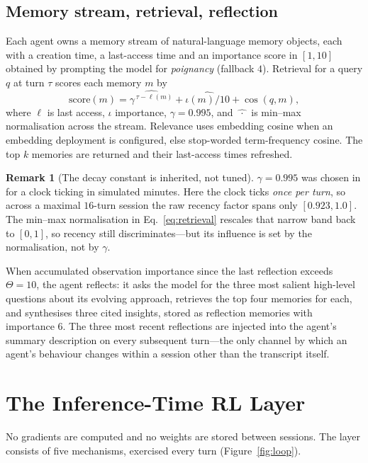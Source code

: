 \documentclass[11pt]{article}
\theoremstyle{plain}
\theoremstyle{definition}
\newtheorem{remark}{Remark}
\begin{document}
\subsection{Memory stream, retrieval, reflection}
Each agent owns a memory stream of natural-language memory objects, each with a
creation time, a last-access time and an importance score in $[1,10]$ obtained
by prompting the model for \emph{poignancy} (fallback $4$). Retrieval for a
query $q$ at turn $\tau$ scores each memory $m$ by
\begin{equation}
\mathrm{score}(m) = \widehat{\gamma^{\,\tau - \ell(m)}}
 + \widehat{\iota(m)/10}
 + \widehat{\cos(q,m)},
\label{eq:retrieval}
\end{equation}
where $\ell$ is last access, $\iota$ importance, $\gamma = 0.995$, and
$\widehat{\;\cdot\;}$ is min--max normalisation across the stream. Relevance
uses embedding cosine when an embedding deployment is configured, else
stop-worded term-frequency cosine. The top $k$ memories are returned and their
last-access times refreshed.

\begin{remark}[The decay constant is inherited, not tuned]
$\gamma = 0.995$ was chosen in \citet{park2023generative} for a clock ticking in
simulated minutes. Here the clock ticks \emph{once per turn}, so across a
maximal $16$-turn session the raw recency factor spans only $[0.923, 1.0]$. The
min--max normalisation in Eq.~\ref{eq:retrieval} rescales that narrow band back
to $[0,1]$, so recency still discriminates---but its influence is set by the
normalisation, not by $\gamma$.
\end{remark}

When accumulated observation importance since the last reflection exceeds
$\Theta = 10$, the agent reflects: it asks the model for the three most salient
high-level questions about its evolving approach, retrieves the top four
memories for each, and synthesises three cited insights, stored as reflection
memories with importance $6$. The three most recent reflections are injected
into the agent's summary description on every subsequent turn---the only channel
by which an agent's behaviour changes within a session other than the transcript
itself.

\section{The Inference-Time RL Layer}
\label{sec:rl}
No gradients are computed and no weights are stored between sessions. The layer
consists of five mechanisms, exercised every turn (Figure~\ref{fig:loop}).
\end{document}
